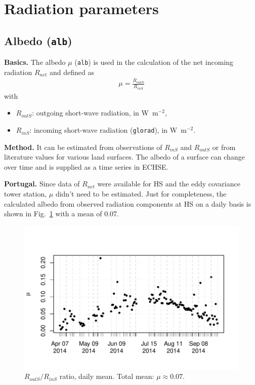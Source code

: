\documentclass{scrreprt}
\newenvironment{denseitem}{
  \begin{itemize}
    \setlength{\itemsep}{0pt}
    \setlength{\parskip}{0pt}
    \setlength{\parsep}{0pt}
}{
  \end{itemize}
}
\begin{document}
\newpage
\section{Radiation parameters} \label{sec:parest_rad}

\subsection{Albedo (\texttt{alb})} \label{ssec:parest_rad_alb}

\textbf{Basics.}
The albedo $\mu$ (\verb!alb!) is used in the calculation of the net incoming radiation $R_{net}$ and defined as
\begin{align*}
  \mu = \frac{R_{outS}}{R_{inS}}
\end{align*}
%
with
\begin{denseitem}
  \item[] $R_{outS}$: outgoing short-wave radiation, in W~m$^{-2}$,
  \item[] $R_{inS}$: incoming short-wave radiation (\verb!glorad!), in W~m$^{-2}$.
\end{denseitem}

\noindent
\textbf{Method.}
It can be estimated from observations of $R_{inS}$ and $R_{outS}$ or from literature values for various land surfaces.
The albedo of a surface can change over time and is supplied as a time series in ECHSE.

\noindent
\textbf{Portugal.}
Since data of $R_{net}$ were available for HS and the eddy covariance tower station, $\mu$ didn't need to be estimated.
Just for completeness, the calculated albedo from observed radiation components at HS on a daily basis is shown in Fig.~\ref{fig:portugal_alb} with a mean of 0.07.

\begin{figure}[ht]
  \centering
  \includegraphics[width=0.6\hsize]{./fig/plot_alb.pdf}
  \caption{$R_{outS}/R_{inS}$ ratio, daily mean. Total mean: $\mu \approx 0.07$.}
  \label{fig:portugal_alb}
\end{figure}
\end{document}

